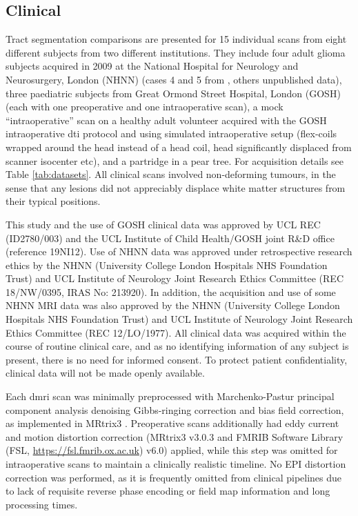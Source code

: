 \subsection{Clinical}

Tract segmentation comparisons are presented for 15 individual scans from eight different subjects from two different institutions.
They include four adult glioma subjects acquired in 2009 at the National Hospital for Neurology and Neurosurgery, London (NHNN) (cases 4 and 5 from \textcite{Mancini2022}, others unpublished data),
three paediatric subjects from Great Ormond Street Hospital, London (GOSH) (each with one preoperative and one intraoperative scan),
a mock “intraoperative” scan on a healthy adult volunteer acquired with the GOSH intraoperative \gls{dti} protocol and using simulated intraoperative setup (flex-coils wrapped around the head instead of a head coil, head significantly displaced from scanner isocenter etc),
and a partridge in a pear tree.
For acquisition details see Table \ref{tab:datasets}.
All clinical scans involved non-deforming tumours, in the sense that any lesions did not appreciably displace white matter structures from their typical positions.

This study and the use of GOSH clinical data was approved by UCL REC (ID2780/003) and the UCL Institute of Child Health/GOSH joint R\&D office (reference 19NI12).
Use of NHNN data was approved under retrospective research ethics by the NHNN (University College London Hospitals NHS Foundation Trust) and UCL Institute of Neurology Joint Research Ethics Committee (REC 18/NW/0395, IRAS No: 213920).
In addition, the acquisition and use of some NHNN MRI data was also approved by the NHNN (University College London Hospitals NHS Foundation Trust) and UCL Institute of Neurology Joint Research Ethics Committee (REC 12/LO/1977).
All clinical data was acquired within the course of routine clinical care, and as no identifying information of any subject is present, there is no need for informed consent.
To protect patient confidentiality, clinical data will not be made openly available.

Each \gls{dmri} scan was minimally preprocessed with Marchenko-Pastur principal component analysis denoising\autocite{Veraart2016, Cordero-Grande2019} Gibbs-ringing correction\autocite{Kellner2016} and bias field correction,\autocite{Zhang2001, Smith2004} as implemented in MRtrix3 \autocite{Tournier2019}.
Preoperative scans additionally had eddy current and motion distortion correction\autocite{Andersson2016a, Smith2004} (MRtrix3 v3.0.3 and FMRIB Software Library (FSL, \url{https://fsl.fmrib.ox.ac.uk}) v6.0) applied, while this step was omitted for intraoperative scans to maintain a clinically realistic timeline.
No EPI distortion correction was performed, as it is frequently omitted from clinical pipelines due to lack of requisite reverse phase encoding or field map information and long processing times.\autocite{Yang2022}

